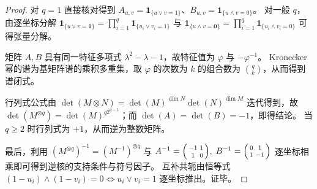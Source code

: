 \begin{proof}
对 \(q=1\) 直接核对得到 \(A_{u,v}=\mathbf{1}_{\{u\vee v=1\}}\)、\(B_{u,v}=\mathbf{1}_{\{u\wedge v=0\}}\)。
对一般 \(q\)，由逐坐标分解
\(
\mathbf{1}_{\{u\vee v=\mathbf{1}\}}=\prod_{i=1}^q \mathbf{1}_{\{u_i\vee v_i=1\}}
\)
与
\(
\mathbf{1}_{\{u\wedge v=\mathbf{0}\}}=\prod_{i=1}^q \mathbf{1}_{\{u_i\wedge v_i=0\}}
\)
可得张量分解。
\par
矩阵 \(A,B\) 具有同一特征多项式 \(\lambda^2-\lambda-1\)，故特征值为 \(\varphi\) 与 \(-\varphi^{-1}\)。
Kronecker 幂的谱为基矩阵谱的乘积多重集，取 \(\varphi\) 的次数为 \(k\) 的组合数为 \(\binom{q}{k}\)，从而得到谱闭式。
\par
行列式公式由 \(\det(M\otimes N)=\det(M)^{\dim N}\det(N)^{\dim M}\) 迭代得到，故 \(\det(M^{\otimes q})=\det(M)^{q2^{q-1}}\)；而 \(\det(A)=\det(B)=-1\)，即得结论。
当 \(q\ge 2\) 时行列式为 \(+1\)，从而逆为整数矩阵。
\par
最后，利用 \((M^{\otimes q})^{-1}=(M^{-1})^{\otimes q}\) 与
\(
A^{-1}=\begin{psmallmatrix}-1&1\\[2pt]1&0\end{psmallmatrix},
\;
B^{-1}=\begin{psmallmatrix}0&1\\[2pt]1&-1\end{psmallmatrix}
\)
逐坐标相乘即可得到逆核的支持条件与符号因子。
互补共轭由恒等式
\(
(1-u_i)\wedge(1-v_i)=0\iff u_i\vee v_i=1
\)
逐坐标推出。证毕。
\end{proof}

